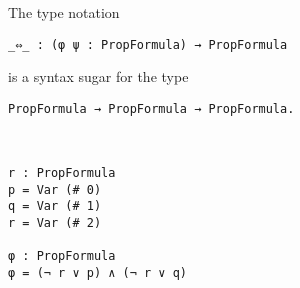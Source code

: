 \documentclass[../main.tex]{subfiles}
\begin{document}
\begin{myremark}
The type notation
\begin{verbatim}
_⇔_ : (φ ψ : PropFormula) → PropFormula
\end{verbatim}
is a syntax sugar for the type
\begin{verbatim}
PropFormula → PropFormula → PropFormula.
\end{verbatim}
\end{myremark}

\begin{myexample}
\hspace*{5cm}\\[3mm]
\begin{verbatim}
r : PropFormula
p = Var (# 0)
q = Var (# 1)
r = Var (# 2)

φ : PropFormula
φ = (¬ r ∨ p) ∧ (¬ r ∨ q)
\end{verbatim}
\end{myexample}
\end{document}
